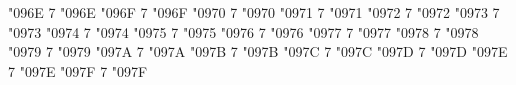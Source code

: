 \Umathcode "096E 7 \symoperators "096E%
\Umathcode "096F 7 \symoperators "096F%
%
\Umathcode "0970 7 \symoperators "0970%
\Umathcode "0971 7 \symoperators "0971%
\Umathcode "0972 7 \symoperators "0972%
\Umathcode "0973 7 \symoperators "0973%
\Umathcode "0974 7 \symoperators "0974%
\Umathcode "0975 7 \symoperators "0975%
\Umathcode "0976 7 \symoperators "0976%
\Umathcode "0977 7 \symoperators "0977%
\Umathcode "0978 7 \symoperators "0978%
\Umathcode "0979 7 \symoperators "0979%
\Umathcode "097A 7 \symoperators "097A%
\Umathcode "097B 7 \symoperators "097B%
\Umathcode "097C 7 \symoperators "097C%
\Umathcode "097D 7 \symoperators "097D%
\Umathcode "097E 7 \symoperators "097E%
\Umathcode "097F 7 \symoperators "097F%


